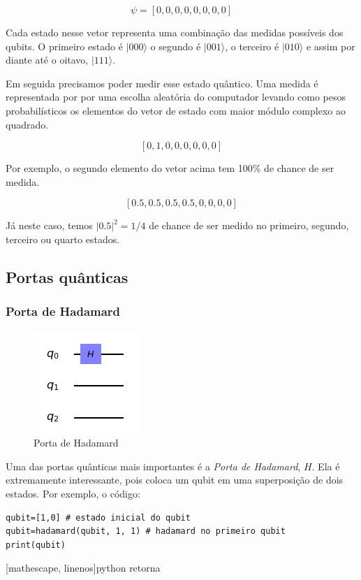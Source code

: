 \documentclass[12pt,a4paper]{article}
\begin{document}
$${ \psi=[0, 0, 0, 0, 0, 0, 0, 0]}$$

Cada estado nesse vetor representa uma combinação das medidas possíveis dos qubits. O primeiro estado é $|000\rangle$ o segundo é $|001\rangle$, o terceiro é $|010\rangle$ e assim por diante até o oitavo, $|111\rangle$.

Em seguida precisamos poder medir esse estado quântico. Uma medida é representada por por uma escolha aleatória do computador levando como pesos probabilísticos os elementos do vetor de estado com maior módulo complexo ao quadrado.

$${[0, 1, 0, 0, 0, 0, 0, 0]}$$

Por exemplo, o segundo elemento do vetor acima tem 100\% de chance de ser medida.

$${[0.5, 0.5, 0.5, 0.5, 0, 0, 0, 0]}$$

Já neste caso, temos $|0.5|^{2}=1/4$ de chance de ser medido no primeiro, segundo, terceiro ou quarto estados.


\subsection{Portas quânticas}
\subsubsection{Porta de Hadamard}

\begin{figure}[h]
    \centering
    \includegraphics{hadamard_gate.png}
        \caption{Porta de Hadamard}
    \label{fig:hgate}
\end{figure}

Uma das portas quânticas mais importantes é a \textit{Porta de Hadamard}, $H$. Ela é extremamente interessante, pois coloca um qubit em uma superposição de dois estados. Por exemplo, o código:

\begin{verbatim}
qubit=[1,0] # estado inicial do qubit
qubit=hadamard(qubit, 1, 1) # hadamard no primeiro qubit
print(qubit)
\end{verbatim}[mathescape, linenos]{python}
retorna
\end{document}
